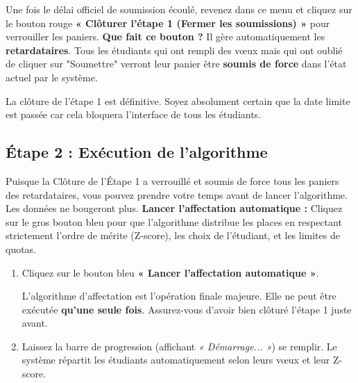 \documentclass[12pt,a4paper]{article}
\begin{document}
Une fois le délai officiel de soumission écoulé, revenez dans ce menu et cliquez sur le bouton rouge \textbf{« Clôturer l'étape 1 (Fermer les soumissions) »} pour verrouiller les paniers.
\newline \textbf{Que fait ce bouton ?} Il gère automatiquement les \textbf{retardataires}. Tous les étudiants qui ont rempli des vœux mais qui ont oublié de cliquer sur "Soumettre" verront leur panier être \textbf{soumis de force} dans l'état actuel par le système.
\begin{tcolorbox}[colback=red!5!white,colframe=red!75!black,title=⚠️ ACTION CRITIQUE UNIQUE]
La clôture de l'étape 1 est définitive. Soyez absolument certain que la date limite est passée car cela bloquera l'interface de tous les étudiants.
\end{tcolorbox}

\subsection{Étape 2 : Exécution de l'algorithme}
Puisque la Clôture de l'Étape 1 a verrouillé et soumis de force tous les paniers des retardataires, vous pouvez prendre votre temps avant de lancer l'algorithme. Les données ne bougeront plus.
\newline \textbf{Lancer l'affectation automatique :} Cliquez sur le gros bouton bleu pour que l'algorithme distribue les places en respectant strictement l'ordre de mérite (Z-score), les choix de l'étudiant, et les limites de quotas.

\begin{enumerate}
    \item Cliquez sur le bouton bleu \textbf{« Lancer l'affectation automatique »}.
    \begin{tcolorbox}[colback=red!5!white,colframe=red!75!black,title=⚠️ ACTION CRITIQUE UNIQUE]
    L'algorithme d'affectation est l'opération finale majeure. Elle ne peut être exécutée \textbf{qu'une seule fois}. Assurez-vous d'avoir bien clôturé l'étape 1 juste avant.
    \end{tcolorbox}
    \item Laissez la barre de progression (affichant \textit{« Démarrage... »}) se remplir. Le système répartit les étudiants automatiquement selon leurs vœux et leur Z-score.
\end{enumerate}
\end{document}
